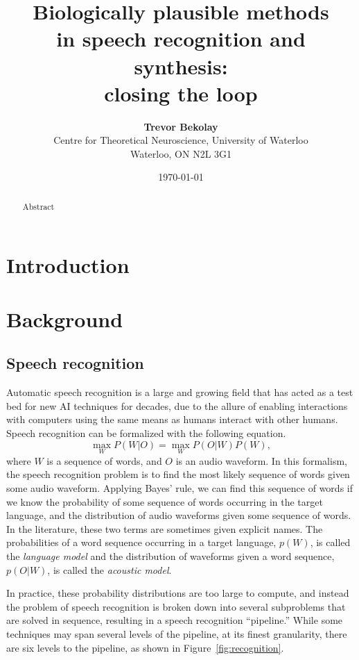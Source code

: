 \documentclass{article}
\title{\bf Biologically plausible methods \\
  in speech recognition and synthesis: \\
  closing the loop}
\date{\today}
\author{{\bf Trevor Bekolay} \\
  Centre for Theoretical Neuroscience, University of Waterloo \\
  Waterloo, ON  N2L 3G1}
\begin{document}
\maketitle

\begin{abstract}
  Abstract
\end{abstract}

\section{Introduction}

\section{Background}

\subsection{Speech recognition}

Automatic speech recognition
is a large and growing field
that has acted as a test bed
for new AI techniques for decades,
due to the allure of enabling
interactions with computers
using the same means
as humans interact with other humans.
Speech recognition can be formalized
with the following equation.
\begin{equation}
  \max_W P(W|O) = \max_W P(O|W) P(W),
\end{equation}
where $W$ is a sequence of words,
and $O$ is an audio waveform.
In this formalism, the speech recognition problem
is to find the most likely sequence of words
given some audio waveform.
Applying Bayes' rule, we can find
this sequence of words
if we know the probability
of some sequence of words occurring
in the target language,
and the distribution of audio waveforms
given some sequence of words.
In the literature, these two terms
are sometimes given explicit names.
The probabilities of a word sequence
occurring in a target language,
$p(W)$, is called the \textit{language model}
and the distribution of waveforms
given a word sequence, $p(O|W)$,
is called the \textit{acoustic model}.

In practice, these probability distributions
are too large to compute,
and instead the problem of speech recognition
is broken down into several subproblems
that are solved in sequence,
resulting in a speech recognition ``pipeline.''
While some techniques may span several levels
of the pipeline, at its finest granularity,
there are six levels to the pipeline,
as shown in Figure~\ref{fig:recognition}.
\end{document}
